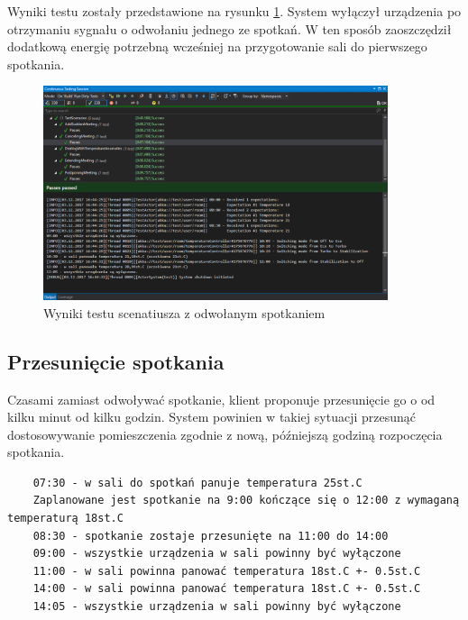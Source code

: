 Wyniki testu zostały przedstawione na rysunku \ref{fig:CancelledMeeting}.
System wyłączył urządzenia po otrzymaniu sygnału o odwołaniu jednego ze spotkań. W ten sposób zaoszczędził dodatkową energię potrzebną wcześniej na przygotowanie sali do pierwszego spotkania. 
\begin{figure}[p]
    \centering
    \includegraphics[width=0.90\textwidth]{./screenshots/CancelledMeeting.png}
    \caption{Wyniki testu scenatiusza z odwołanym spotkaniem}
    \label{fig:CancelledMeeting}    
\end{figure}

\subsection{Przesunięcie spotkania}
Czasami zamiast odwoływać spotkanie, klient proponuje przesunięcie go o od kilku minut od kilku godzin. 
System powinien w takiej sytuacji przesunąć dostosowywanie pomieszczenia zgodnie z nową, późniejszą godziną rozpoczęcia spotkania.
\begin{lstlisting}
    07:30 - w sali do spotkań panuje temperatura 25st.C
    Zaplanowane jest spotkanie na 9:00 kończące się o 12:00 z wymaganą temperaturą 18st.C
    08:30 - spotkanie zostaje przesunięte na 11:00 do 14:00
    09:00 - wszystkie urządzenia w sali powinny być wyłączone
    11:00 - w sali powinna panować temperatura 18st.C +- 0.5st.C
    14:00 - w sali powinna panować temperatura 18st.C +- 0.5st.C
    14:05 - wszystkie urządzenia w sali powinny być wyłączone
\end{lstlisting}

